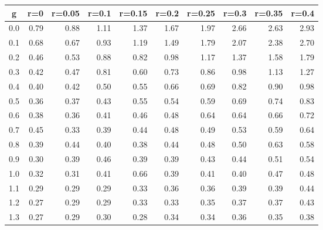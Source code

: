 %
\begin{table}[!tbp]
 \begin{center}
 \begin{tabular}{rrrrrrrrrr}\hline\hline
\multicolumn{1}{c}{g}&\multicolumn{1}{c}{r=0}&\multicolumn{1}{c}{r=0.05}&\multicolumn{1}{c}{r=0.1}&\multicolumn{1}{c}{r=0.15}&\multicolumn{1}{c}{r=0.2}&\multicolumn{1}{c}{r=0.25}&\multicolumn{1}{c}{r=0.3}&\multicolumn{1}{c}{r=0.35}&\multicolumn{1}{c}{r=0.4}\tabularnewline
\hline
0.0&0.79&0.88&1.11&1.37&1.67&1.97&2.66&2.63&2.93\tabularnewline
0.1&0.68&0.67&0.93&1.19&1.49&1.79&2.07&2.38&2.70\tabularnewline
0.2&0.46&0.53&0.88&0.82&0.98&1.17&1.37&1.58&1.79\tabularnewline
0.3&0.42&0.47&0.81&0.60&0.73&0.86&0.98&1.13&1.27\tabularnewline
0.4&0.40&0.42&0.50&0.55&0.66&0.69&0.82&0.90&0.98\tabularnewline
0.5&0.36&0.37&0.43&0.55&0.54&0.59&0.69&0.74&0.83\tabularnewline
0.6&0.38&0.36&0.41&0.46&0.48&0.64&0.64&0.66&0.72\tabularnewline
0.7&0.45&0.33&0.39&0.44&0.48&0.49&0.53&0.59&0.64\tabularnewline
0.8&0.39&0.44&0.40&0.38&0.44&0.48&0.50&0.63&0.58\tabularnewline
0.9&0.30&0.39&0.46&0.39&0.39&0.43&0.44&0.51&0.54\tabularnewline
1.0&0.32&0.31&0.41&0.66&0.39&0.41&0.40&0.47&0.48\tabularnewline
1.1&0.29&0.29&0.29&0.33&0.36&0.36&0.39&0.39&0.44\tabularnewline
1.2&0.27&0.29&0.29&0.33&0.33&0.35&0.37&0.37&0.43\tabularnewline
1.3&0.27&0.29&0.30&0.28&0.34&0.34&0.36&0.35&0.38\tabularnewline
\hline
\end{tabular}

\end{center}

\end{table}

